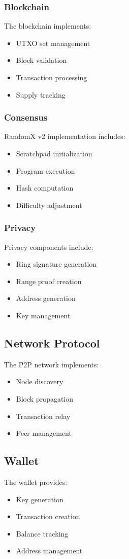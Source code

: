 \documentclass[11pt]{article}
\begin{document}
\subsubsection{Blockchain}
The blockchain implements:
\begin{itemize}
    \item UTXO set management
    \item Block validation
    \item Transaction processing
    \item Supply tracking
\end{itemize}

\subsubsection{Consensus}
RandomX v2 implementation includes:
\begin{itemize}
    \item Scratchpad initialization
    \item Program execution
    \item Hash computation
    \item Difficulty adjustment
\end{itemize}

\subsubsection{Privacy}
Privacy components include:
\begin{itemize}
    \item Ring signature generation
    \item Range proof creation
    \item Address generation
    \item Key management
\end{itemize}

\subsection{Network Protocol}
The P2P network implements:
\begin{itemize}
    \item Node discovery
    \item Block propagation
    \item Transaction relay
    \item Peer management
\end{itemize}

\subsection{Wallet}
The wallet provides:
\begin{itemize}
    \item Key generation
    \item Transaction creation
    \item Balance tracking
    \item Address management
\end{itemize}
\end{document}
